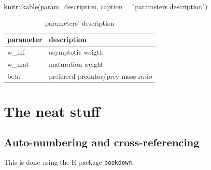 \documentclass[
  11pt,
]{article}
\newenvironment{Shaded}{\begin{snugshade}}{\end{snugshade}}
\newcommand{\AttributeTok}[1]{\textcolor[rgb]{0.77,0.63,0.00}{#1}}
\newcommand{\FunctionTok}[1]{\textcolor[rgb]{0.00,0.00,0.00}{#1}}
\newcommand{\NormalTok}[1]{#1}
\newcommand{\SpecialCharTok}[1]{\textcolor[rgb]{0.00,0.00,0.00}{#1}}
\newcommand{\StringTok}[1]{\textcolor[rgb]{0.31,0.60,0.02}{#1}}
\begin{document}
\begin{Shaded}
\begin{Highlighting}[]
\NormalTok{knitr}\SpecialCharTok{::}\FunctionTok{kable}\NormalTok{(param\_description, }\AttributeTok{caption =} \StringTok{"parameters\textquotesingle{} description"}\NormalTok{)}
\end{Highlighting}
\end{Shaded}

\begin{table}

\caption{\label{tab:params}parameters' description}
\centering
\begin{tabular}[t]{l|l}
\hline
parameter & description\\
\hline
w\_inf & asymptotic weigth\\
\hline
w\_mat & maturation weight\\
\hline
beta & preferred predator/prey mass ratio\\
\hline
\end{tabular}
\end{table}

\newpage

\hypertarget{the-neat-stuff}{%
\section{The neat stuff}\label{the-neat-stuff}}

\hypertarget{auto-numbering-and-cross-referencing}{%
\subsection{Auto-numbering and cross-referencing}\label{auto-numbering-and-cross-referencing}}

This is done using the R package \texttt{bookdown}.

\begin{Shaded}
\end{Shaded}
\end{document}
